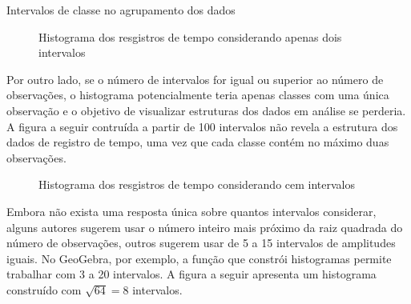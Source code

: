 {{\begin{example}{Intervalos de classe no agrupamento dos dados}
\begin{figure}[H]
\begin{tikzpicture}
\end{tikzpicture}
\caption{Histograma dos resgistros de tempo considerando apenas dois intervalos}
\label{est1-fig-14}
\end{figure}

Por outro lado, se o número de intervalos for igual ou superior ao número de observações, o histograma potencialmente teria apenas classes com uma única observação e o objetivo de visualizar estruturas dos dados em análise se perderia. A figura a seguir contruída a partir de 100 intervalos não revela a estrutura dos dados de registro de tempo, uma vez que cada classe contém no máximo duas observações.

\begin{figure}[H]
\centering
\capstart


\caption{Histograma dos resgistros de tempo considerando cem intervalos}
\label{est1-fig-15}
\end{figure}

Embora não exista uma resposta única sobre quantos intervalos considerar, alguns autores sugerem usar o número inteiro mais próximo da raiz quadrada do número de observações, outros sugerem usar de 5 a 15 intervalos de amplitudes iguais. No GeoGebra, por exemplo, a função que constrói histogramas permite trabalhar com 3 a 20 intervalos. A figura a seguir apresenta um histograma construído com \(\sqrt{64}=8\) intervalos.


\end{example}}}
